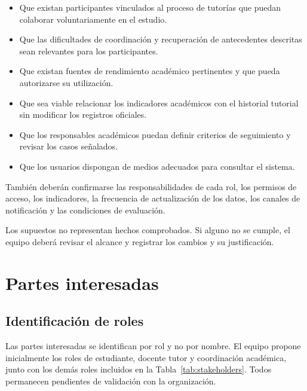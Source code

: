 \documentclass[11pt,a4paper]{article}
\begin{document}
\begin{itemize}

    \item Que existan participantes vinculados al
    proceso de tutorías que puedan colaborar
    voluntariamente en el estudio.

    \item Que las dificultades de coordinación y
    recuperación de antecedentes descritas sean
    relevantes para los participantes.

    \item Que existan fuentes de rendimiento académico
    pertinentes y que pueda autorizarse su utilización.

    \item Que sea viable relacionar los indicadores
    académicos con el historial tutorial sin modificar
    los registros oficiales.

    \item Que los responsables académicos puedan
    definir criterios de seguimiento y revisar
    los casos señalados.

    \item Que los usuarios dispongan de medios
    adecuados para consultar el sistema.

\end{itemize}

También deberán confirmarse las responsabilidades de
cada rol, los permisos de acceso, los indicadores,
la frecuencia de actualización de los datos, los
canales de notificación y las condiciones de evaluación.

Los supuestos no representan hechos comprobados.
Si alguno no se cumple, el equipo deberá revisar
el alcance y registrar los cambios y su justificación.
\section{Partes interesadas}

\subsection{Identificación de roles}

Las partes interesadas se identifican por rol y no por nombre.
El equipo propone inicialmente los roles de estudiante,
docente tutor y coordinación académica, junto con los demás
roles incluidos en la Tabla~\ref{tab:stakeholders}.
Todos permanecen pendientes de validación con la organización.
\end{document}
